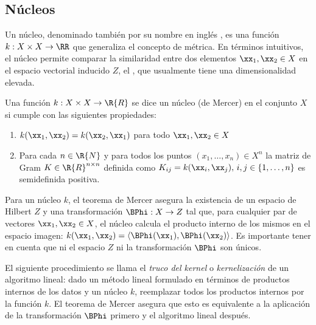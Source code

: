 \subsection{Núcleos}
%
Un núcleo, denominado también por su nombre en inglés , es
una función $k:X\times{}X\rightarrow{}\RR$ \cite{stewart} que
generaliza el concepto de métrica. En términos intuitivos, el núcleo
permite comparar la similaridad entre dos elementos
$\xx_1,\xx_2\in{}X$ en el espacio vectorial inducido $Z$, el
, que usualmente tiene una dimensionalidad elevada.

%
\begin{definicion}
[Núcleo]
  Una función $k:X\times{}X\rightarrow{}\R{R}$ se dice un núcleo (de
  Mercer) en el conjunto $X$ si cumple con las siguientes propiedades:
  \begin{enumerate}
  \item $k(\xx_1,\xx_2)=k(\xx_2,\xx_1)$ para todo $\xx_1,\xx_2\in{}X$
  \item Para cada $n\in\R{N}$ y para todos los puntos
    $(x_1,\ldots,x_n)\in{}X^n$ la matriz de Gram
    $K\in\R{R}^{n\times{}n}$ definida como
    $K_{ij}=k(\xx_i,\xx_j),\,i,j\in\{1,\ldots,n\}$ es semidefinida
    positiva.
  \end{enumerate}
\end{definicion}
%

Para un núcleo $k$, el teorema de Mercer \cite{mercer} asegura la
existencia de un espacio de Hilbert $Z$ y una transformación
$\BPhi:X\rightarrow{}Z$ tal que, para cualquier par de vectores
$\xx_1,\xx_2\in{}X$, el núcleo calcula el producto interno de los
mismos en el espacio imagen:
$k(\xx_1,\xx_2)=\langle\BPhi(\xx_1),\BPhi(\xx_2)\rangle$. Es
importante tener en cuenta que ni el espacio $Z$ ni la transformación
$\BPhi$ son únicos.

El siguiente procedimiento se llama el \emph{truco del kernel} o
\emph{kernelización} de un algoritmo lineal: dado un método lineal
formulado en términos de productos internos de los datos y un núcleo
$k$, reemplazar todos los productos internos por la función $k$.  El
teorema de Mercer asegura que esto es equivalente a la aplicación de
la transformación $\BPhi$ primero y el algoritmo
lineal después.

